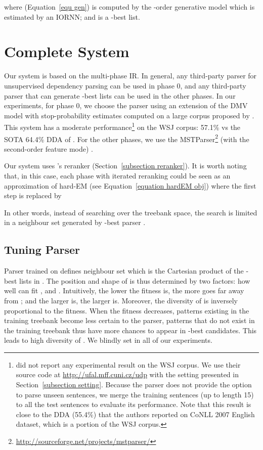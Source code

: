 \documentclass[11pt,letterpaper]{article}
\begin{document}
where  (Equation~\ref{equ gen}) is computed by the -order generative model 
which is estimated by an IORNN; 
and  is a -best list.



\section{Complete System}
\label{section system}

Our system is based on the multi-phase IR.
In general, any third-party parser for unsupervised 
dependency parsing can be used in phase 0, and any third-party 
parser that can generate -best lists can be used in the other 
phases. In our experiments, for phase 0, we choose the parser 
using an extension of the DMV model with stop-probability estimates
computed on a large corpus proposed by . 
This system has a moderate performance\footnote{
\label{footnote mz}
did not report any experimental result on the WSJ corpus. We use 
their source code at \url{http://ufal.mff.cuni.cz/udp}
with the setting presented in Section~\ref{subsection setting}. 
Because the parser does not provide the option to parse unseen 
sentences, we merge the training sentences (up to length 15) to all 
the test sentences to evaluate its performance. Note that 
this result is close to the DDA (55.4\%) that the authors reported on 
CoNLL 2007 English dataset, which is a portion of the WSJ corpus.}
on the WSJ corpus: 57.1\% vs the SOTA 64.4\% DDA of 
. For the other phases, 
we use the MSTParser\footnote{\url{http://sourceforge.net/projects/mstparser/}}
(with the second-order feature mode) \cite{DBLP:conf/eacl/McDonaldP06}.

Our system uses 's reranker (Section~\ref{subsection reranker}). 
It is worth noting that, in this case, each phase with iterated 
reranking could be seen as an approximation of hard-EM 
(see Equation~\ref{equation hardEM obj}) where 
the first step is replaced by 

In other words, instead of searching over the treebank space, 
the search is limited in a neighbour set  
generated by -best parser .

\subsection{Tuning Parser }
\label{subsection tuning parser}
Parser  trained on  defines neighbour set
 which is the Cartesian product
of the -best lists in . The position and shape 
of  is thus determined by two factors:  
how well  can fit , and . Intuitively, 
the lower the fitness is, the more 
goes far away from ; and the larger  is, 
the larger 
is. Moreover, the diversity of  is inversely 
proportional to the fitness. When the fitness decreases, 
patterns existing in the training treebank become less certain
to the parser, patterns that do not exist in the training treebank 
thus have more chances to appear in -best candidates. This 
leads to high diversity of .
We blindly set  in all of our experiments. 
\end{document}

